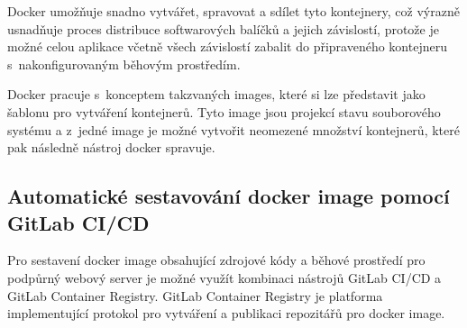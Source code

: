 Docker umožňuje snadno vytvářet, spravovat a sdílet tyto kontejnery, což výrazně usnadňuje proces distribuce softwarových balíčků a jejich závislostí, protože je možné celou aplikace včetně všech závislostí zabalit do připraveného kontejneru s~nakonfigurovaným běhovým prostředím. 

Docker pracuje s~konceptem takzvaných images, které si lze představit jako šablonu pro vytváření kontejnerů. Tyto image jsou projekcí stavu souborového systému a z~jedné image je možné vytvořit neomezené množství kontejnerů, které pak následně nástroj docker spravuje. 


\subsection{Automatické sestavování docker image pomocí GitLab CI/CD}

Pro sestavení docker image obsahující zdrojové kódy a běhové prostředí pro podpůrný webový server je možné využít kombinaci nástrojů GitLab CI/CD a GitLab Container Registry. GitLab Container Registry je platforma implementující protokol pro vytváření a publikaci repozitářů pro docker image.

